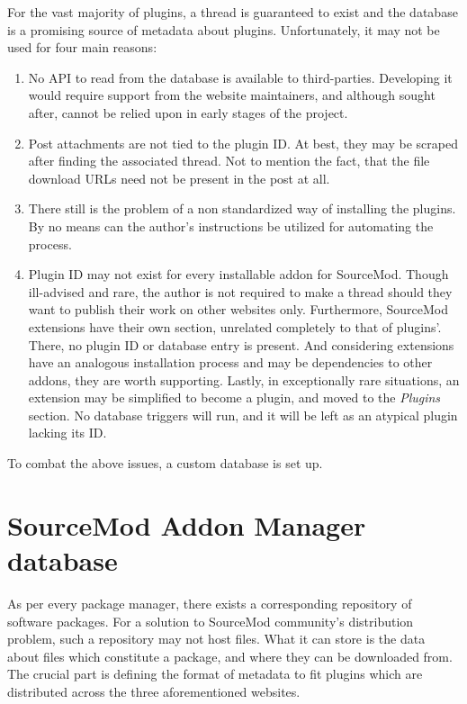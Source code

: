 For the vast majority of plugins, a thread is guaranteed to exist and the database is a promising source of metadata about plugins.
Unfortunately, it may not be used for four main reasons:
\begin{enumerate}
\item
No API to read from the database is available to third-parties.
Developing it would require support from the website maintainers, and although sought after, cannot be relied upon in early stages of the project.
\item
Post attachments are not tied to the plugin ID.
At best, they may be scraped after finding the associated thread.
Not to mention the fact, that the file download URLs need not be present in the post at all.
\item
There still is the problem of a non standardized way of installing the plugins.
By no means can the author's instructions be utilized for automating the process.
\item
Plugin ID may not exist for every installable addon for SourceMod.
Though ill-advised and rare, the author is not required to make a thread should they want to publish their work on other websites only.
Furthermore, SourceMod extensions have their own section, unrelated completely to that of plugins'.
There, no plugin ID or database entry is present.
And considering extensions have an analogous installation process and may be dependencies to other addons, they are worth supporting.
Lastly, in exceptionally rare situations, an extension may be simplified to become a plugin, and moved to the \textit{Plugins} section.
No database triggers will run, and it will be left as an atypical plugin lacking its ID.
\end{enumerate}

To combat the above issues, a custom database is set up.

\section{SourceMod Addon Manager database}

As per every package manager, there exists a corresponding repository of software packages.
For a solution to SourceMod community's distribution problem, such a repository may not host files.
What it can store is the data about files which constitute a package, and where they can be downloaded from.
The crucial part is defining the format of metadata to fit plugins which are distributed across the three aforementioned websites.

